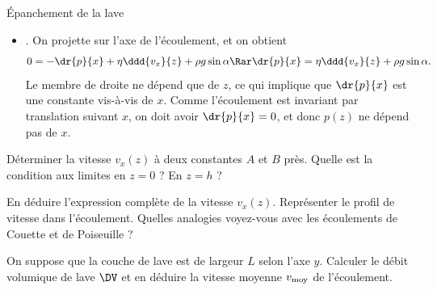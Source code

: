 \begin{exo}[PC][2][TD]{Épanchement de la lave}
\begin{quest}
{\begin{itemize}
  L’écoulement incompressible d’un fluide newtonien est décrit par l’équation de Navier-Stokes,
  $$
  \rho\dr{\Vec{v}}{t} + \rho \left( \Vec{v} \cdot \grad \right) \Vec{v} = \Vec{0} = -\grad p + \eta \Delta \Vec{v} + \rho \Vec{g}.
  $$
  \item {}. On projette sur l’axe de l’écoulement, et on obtient
  $$
  0 = -\dr{p}{x} + \eta \ddd{v_x}{z} + \rho g \sin \alpha \Rar \dr{p}{x} = \eta \ddd{v_x}{z} + \rho g \sin \alpha.
  $$
  Le membre de droite ne dépend que de $z$, ce qui implique que $\dr{p}{x}$ est une constante vis-à-vis de $x$. Comme l’écoulement est invariant par translation suivant $x$, on doit avoir $\dr{p}{x}=0$, et donc 
 $ p(z)$ ne dépend pas de $x$.
\end{itemize}
}
\item Déterminer la vitesse $v_x(z)$ à deux constantes $A$ et $B$ près. Quelle est la condition aux limites en $z=0$ ? En $z=h$ ?
\item En déduire l’expression complète de la vitesse $v_x(z)$. Représenter le profil de vitesse dans l’écoulement. Quelles analogies voyez-vous avec les écoulements de Couette et de Poiseuille ?
\item On suppose que la couche de lave est de largeur $L$ selon l'axe $y$. Calculer le débit volumique de lave $\DV$ et en déduire la vitesse moyenne $v_{\rm moy}$ de l'écoulement.

\end{quest}
\end{exo}
